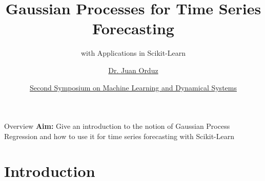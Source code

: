 \documentclass[10pt]{beamer}
\title[Gaussian Processes for Time Series Forecasting] %
{Gaussian Processes for Time Series Forecasting}
\subtitle[with Applications in Scikit-Learn]{with Applications in Scikit-Learn}
\author[Dr. Juan Orduz] %
{
\href{https://juanitorduz.github.io/}{Dr. Juan Orduz}
}
\institute[The Fields Institute] %
{
\href{http://www.fields.utoronto.ca/}{The Fields Institute}
}
\date[ Second Symposium on Machine Learning and Dynamical Systems] %
{
\href{http://www.fields.utoronto.ca/activities/20-21/dynamical}{Second Symposium on Machine Learning and Dynamical Systems}
}
\begin{document}
\begin{frame}
  \titlepage
\end{frame}


\begin{frame}{Overview}
{{\bf Aim:} Give an introduction to the notion of Gaussian Process Regression and how to use it for time series forecasting with Scikit-Learn}
\tableofcontents
\end{frame}

\section{Introduction}
\end{document}
